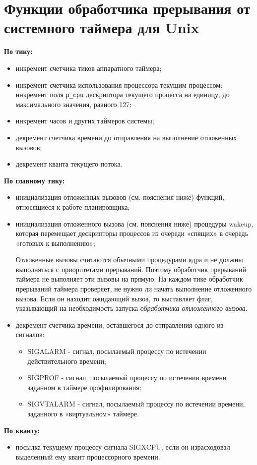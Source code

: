 \documentclass[a4paper,oneside,14pt]{extreport}
\begin{document}
\section*{Функции обработчика прерывания от системного таймера для Unix}
\noindent
\textbf{По тику:}
\begin{itemize}
	\item инкремент счетчика тиков аппаратного таймера;
	\item инкремент счетчика использования процессора текущим процессом: инкремент поля \texttt{p\_cpu} дескриптора текущего процесса на единицу, до максимального значения, равного 127;
	\item инкремент часов и других таймеров системы;
	\item декремент счетчика времени до отправления на выполнение отложенных вызовов;
	\item декремент кванта текущего потока.
\end{itemize}
\textbf{По главному тику:}
\begin{itemize}
	\item инициализация отложенных вызовов (см. пояснения ниже) функций, относящиеся к работе планировщика;
	\item инициализация отложенного вызова (см. пояснения ниже) процедуры wakeup, которая
	перемещает дескрипторы процессов из очереди «спящих» в
	очередь «готовых к выполнению»;
	
	Отложенные вызовы считаются обычными процедурами ядра и не должны выполняться с приоритетами прерываний. Поэтому обработчик прерываний таймера не выполняет эти вызовы на прямую. На каждом тике обработчик прерываний таймера проверяет, не нужно ли начать выполнение отложенного вызова. Если он находит ожидающий вызоа, то выставляет флаг, указывающий на необходимость запуска \textit{обработчика отложенного вызова}.
	
	\item декремент счетчика времени, оставшегося до отправления одного из сигналов: 
	\begin{itemize}
		\item SIGALARM - сигнал, посылаемый процессу по истечении действительного времени;
		\item SIGPROF - сигнал, посылаемый процессу по истечении времени заданном в таймере профилирования;
		\item SIGVTALARM - сигнал, посылаемый процессу по истечении времени, заданного в «виртуальном» таймере.
	\end{itemize}
\end{itemize}
\textbf{По кванту:}
\begin{itemize}
	\item посылка текущему процессу сигнала SIGXCPU, если он израсходовал выделенный ему квант процессорного времени.
\end{itemize}
\end{document}

